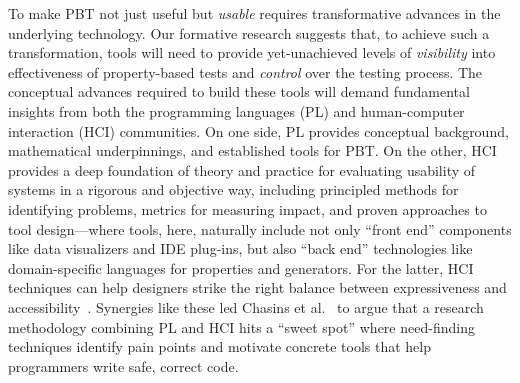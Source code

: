 To make PBT not just useful but
\emph{usable} requires transformative advances in the underlying technology.
Our formative research suggests that, to achieve
such a transformation, tools will need to provide yet-unachieved levels of
\emph{visibility} into effectiveness of property-based tests and \emph{control}
over the testing process.
%
The conceptual advances required to build these tools
will demand fundamental insights from both the
programming languages (PL) and human-computer interaction (HCI)
communities.
On one side, PL provides conceptual background,
mathematical underpinnings, and established tools for PBT.  On the
other, HCI provides a deep foundation of theory and
practice for evaluating usability of systems in a
rigorous and objective way, including principled methods for
identifying problems, metrics for measuring impact, and proven
approaches to tool design---where tools, here, naturally include
not only ``front end'' components like
data visualizers and IDE plug-ins, but
also ``back end'' technologies like domain-specific languages for
properties and generators.  For the latter, HCI techniques
can help designers
strike the right balance between expressiveness and
accessibility~\cite{coblenz_pliers_2021,greenman_little_2022}.
Synergies like these led
Chasins et al.~\cite{chasins_pl_2021} to argue that a research
methodology combining PL and HCI hits a ``sweet spot'' where
need-finding techniques identify
pain points and motivate concrete tools that help programmers write
safe, correct code.

